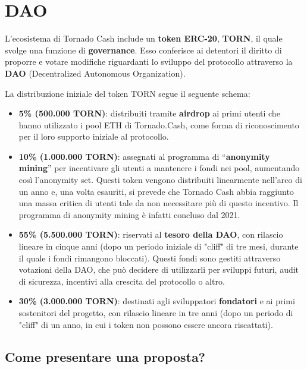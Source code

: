 \chapter{DAO}

L'ecosistema di Tornado Cash include un \textbf{token ERC-20}, \textbf{TORN}, il quale svolge una funzione di \textbf{governance}. Esso conferisce ai detentori il diritto di proporre e votare modifiche riguardanti lo sviluppo del protocollo attraverso la \textbf{DAO} (Decentralized Autonomous Organization).

La distribuzione iniziale del token TORN segue il seguente schema:

\begin{itemize}
    \item \textbf{5\% (500.000 TORN)}: distribuiti tramite \textbf{airdrop} ai primi utenti che hanno utilizzato i pool ETH di Tornado.Cash, come forma di riconoscimento per il loro supporto iniziale al protocollo.
    \item \textbf{10\% (1.000.000 TORN)}: assegnati al programma di ``\textbf{anonymity mining}'' per incentivare gli utenti a mantenere i fondi nei pool, aumentando così l'anonymity set. Questi token vengono distribuiti linearmente nell’arco di un anno e, una volta esauriti, si prevede che Tornado Cash abbia raggiunto una massa critica di utenti tale da non necessitare più di questo incentivo. Il programma di anonymity mining è infatti concluso dal 2021.
    \item \textbf{55\% (5.500.000 TORN)}: riservati al \textbf{tesoro della DAO}, con rilascio lineare in cinque anni (dopo un periodo iniziale di "cliff" di tre mesi, durante il quale i fondi rimangono bloccati). Questi fondi sono gestiti attraverso votazioni della DAO, che può decidere di utilizzarli per sviluppi futuri, audit di sicurezza, incentivi alla crescita del protocollo o altro. 
    \item \textbf{30\% (3.000.000 TORN)}: destinati agli sviluppatori \textbf{fondatori} e ai primi sostenitori del progetto, con rilascio lineare in tre anni (dopo un periodo di "cliff" di un anno, in cui i token non possono essere ancora riscattati).
\end{itemize}

\section{Come presentare una proposta?}

